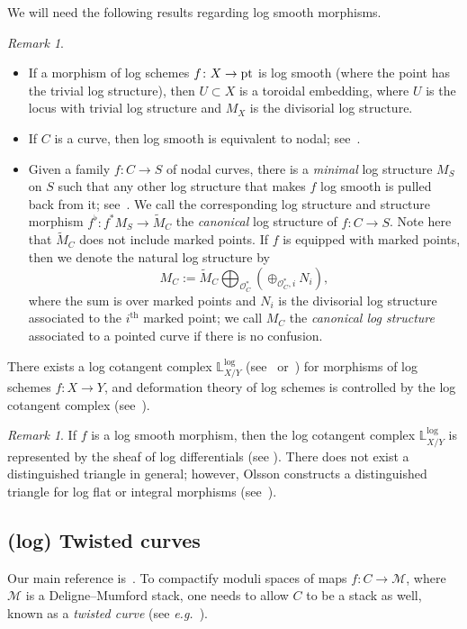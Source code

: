 \documentclass[11pt]{amsart}
\numberwithin{equation}{section}
\theoremstyle{definition}
\theoremstyle{remark}
\newtheorem{remark}[theorem]{Remark}
\newcommand{\bLl}{\mathbb L^{\mathrm{log}}}
\newcommand{\calO}{\mathcal O}
\newcommand{\calM}{\mathcal M}
\newcommand{\supth}[1]{\ensuremath{#1^{\mathrm{th}}}}
\begin{document}
We will need the following results regarding log smooth morphisms. 
\begin{remark}\leavevmode
\begin{itemize}
\item If a morphism of log schemes $f\colon  X \to {\rm pt}$ is log smooth (where the point has the trivial log structure), then $U \subset X$ is a toroidal embedding, where $U$ is the locus with trivial log structure and $M_X$ is the divisorial log structure.
    \item If $C$ is a curve, then log smooth is equivalent to nodal; see~\cite[Theorem 5]{HoM}.
    \item Given a family $f \colon  C \to S$ of nodal curves, there is a \emph{minimal} log structure $M_S$ on $S$ such that any other log structure that makes $f$ log smooth is pulled back from it; see~\cite[Section 7.3]{HoM}. We call the corresponding log structure and structure morphism $f^\flat \colon  f^*M_S \to \tilde{M}_C$ the \emph{canonical} log structure of
      $f \colon  C \to S$. Note here that $\tilde{M}_C$ does not include marked points. If $f$ is equipped with marked points, then we denote the natural log structure by 
    $$
    M_C := \tilde{M}_C \bigoplus_{\calO_C^*} \left( \oplus_{\calO_C^*, i}N_i\right), 
    $$
    where the sum is over marked points and $N_i$ is the divisorial log structure associated to the $\supth{i}$ marked point; we call $M_C$ the \emph{canonical log structure} associated to a pointed curve if there is no confusion. 
\end{itemize}
\end{remark}


There exists a log cotangent complex $\bLl_{X/Y}$ (see~\cite{Olssonlogct} or~\cite[Section 7]{HoM}) for morphisms of log schemes $f\colon  X \to Y$, and deformation theory of log schemes is controlled by the log cotangent complex (see~\cite[Theorem 5.2]{Olssonlogct}).

\begin{remark}\label{rmk:logcotangent}
  If $f$ is a log smooth morphism, then the log cotangent complex $\bLl_{X/Y}$ is represented by the sheaf of log differentials (see \cite[Section~1.1(iii)]{Olssonlogct}).
  There does not exist a distinguished triangle in general; however, Olsson constructs a distinguished triangle for log flat or integral morphisms (see~\cite[1.3]{Olssonlogct}).
\end{remark}


\subsection{(log) Twisted curves}
Our main reference is~\cite{Olsson}. To compactify moduli spaces of maps $f\colon  C \to \calM$, where $\calM$ is a Deligne--Mumford stack, one needs to allow $C$ to be a stack as well, known as a \emph{twisted curve} (see \textit{e.g.}~\cite{av, tsm}).
\end{document}
